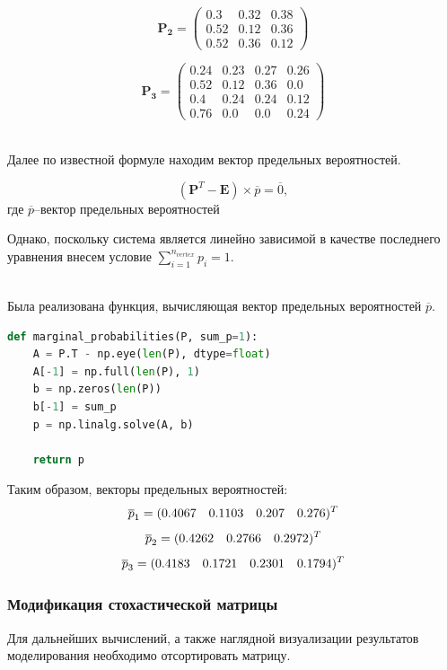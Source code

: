 $$\mathbf{P_{2}}=
\begin{pmatrix}
    0.3 & 0.32 & 0.38 \\
0.52 & 0.12 & 0.36 \\
0.52 & 0.36 & 0.12 
\end{pmatrix}$$

$$\mathbf{P_{3}}=
\begin{pmatrix}
    0.24 & 0.23 & 0.27 & 0.26 \\
0.52 & 0.12 & 0.36 & 0.0 \\
0.4 & 0.24 & 0.24 & 0.12 \\
0.76 & 0.0 & 0.0 & 0.24 
\end{pmatrix}$$

~\\

Далее по известной формуле находим вектор предельных вероятностей.

$$(\mathbf{P}^T-\mathbf{E})\times\overline{p}=\overline{0},$$
где $\overline{p}$--вектор предельных вероятностей

Однако, поскольку система является линейно зависимой в качестве последнего уравнения внесем условие $\sum\limits_{i=1}^{n_{vertex}}p_i=1$.

~\\

Была реализована функция, вычисляющая вектор предельных вероятностей  $\overline{p}$.

\begin{lstlisting}[language=python, label=prog,caption={\textit{расчет вектора предельных вероятностей}}]
def marginal_probabilities(P, sum_p=1):
    A = P.T - np.eye(len(P), dtype=float)
    A[-1] = np.full(len(P), 1)
    b = np.zeros(len(P))
    b[-1] = sum_p
    p = np.linalg.solve(A, b)

    return p
\end{lstlisting}

Таким образом, векторы предельных вероятностей:
$$\overline{p}_{1}=( 0.4067\quad0.1103\quad0.207\quad0.276 \\
 )^T$$
$$\overline{p}_{2}=( 0.4262\quad0.2766\quad0.2972 \\
 )^T$$
$$\overline{p}_{3}=( 0.4183\quad0.1721\quad0.2301\quad0.1794 \\
 )^T$$

\subsubsection{Модификация стохастической матрицы}
Для дальнейших вычислений, а также наглядной визуализации результатов моделирования необходимо отсортировать матрицу.

